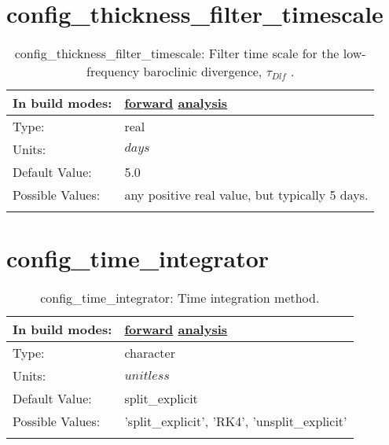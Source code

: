 \section[config\_thickness\_filter\_timescale]{config\_thickness\_filter\_timescale}
\label{sec:nm_sec_config_thickness_filter_timescale}
\begin{center}
\begin{longtable}{| p{2.0in} || p{4.0in} |}
    \hline
    In build modes: & \hyperref[subsec:forward_nm_tab_ALE_frequency_filtered_thickness]{forward} \hyperref[subsec:analysis_nm_tab_ALE_frequency_filtered_thickness]{analysis} \\
    \hline
    Type: & real \\
    \hline
    Units: & $days$ \\
    \hline
    Default Value: & 5.0 \\
    \hline
    Possible Values: & any positive real value, but typically 5 days. \\
    \hline
    \caption{config\_thickness\_filter\_timescale:  Filter time scale for the low-frequency baroclinic divergence,  $\tau_{Dlf}$ .}
\end{longtable}
\end{center}
\section[config\_time\_integrator]{config\_time\_integrator}
\label{sec:nm_sec_config_time_integrator}
\begin{center}
\begin{longtable}{| p{2.0in} || p{4.0in} |}
    \hline
    In build modes: & \hyperref[subsec:forward_nm_tab_time_integration]{forward} \hyperref[subsec:analysis_nm_tab_time_integration]{analysis} \\
    \hline
    Type: & character \\
    \hline
    Units: & $unitless$ \\
    \hline
    Default Value: & split\_explicit \\
    \hline
    Possible Values: & 'split\_explicit', 'RK4', 'unsplit\_explicit' \\
    \hline
    \caption{config\_time\_integrator: Time integration method.}
\end{longtable}
\end{center}
